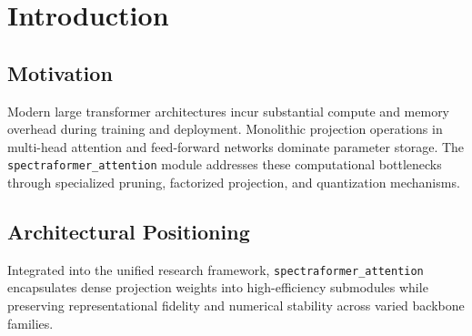 \section{Introduction}

\subsection{Motivation}
Modern large transformer architectures incur substantial compute and memory overhead during training and deployment. Monolithic projection operations in multi-head attention and feed-forward networks dominate parameter storage. The \texttt{spectraformer_attention} module addresses these computational bottlenecks through specialized pruning, factorized projection, and quantization mechanisms.

\subsection{Architectural Positioning}
Integrated into the unified research framework, \texttt{spectraformer_attention} encapsulates dense projection weights into high-efficiency submodules while preserving representational fidelity and numerical stability across varied backbone families.
